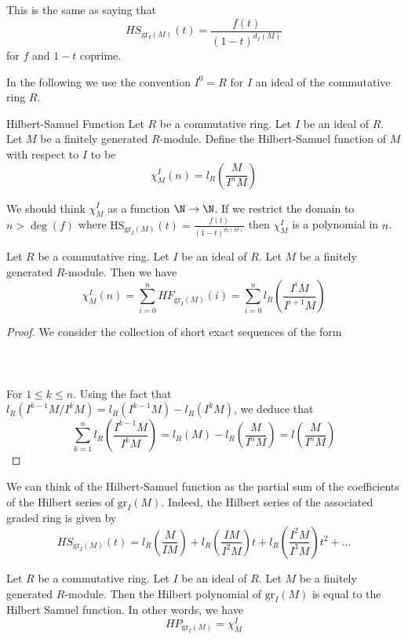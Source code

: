\documentclass[a4paper]{article}
\begin{document}
This is the same as saying that $$HS_{\text{gr}_I(M)}(t)=\frac{f(t)}{(1-t)^{d_I(M)}}$$ for $f$ and $1-t$ coprime. 

In the following we use the convention $I^0=R$ for $I$ an ideal of the commutative ring $R$. 

\begin{defn}{Hilbert-Samuel Function}{} Let $R$ be a commutative ring. Let $I$ be an ideal of $R$. Let $M$ be a finitely generated $R$-module. Define the Hilbert-Samuel function of $M$ with respect to $I$ to be $$\chi_M^I(n)=l_R\left(\frac{M}{I^nM}\right)$$
\end{defn}

We should think $\chi_M^I$ as a function $\N\to\N$. If we restrict the domain to $n>\deg(f)$ where $\text{HS}_{\text{gr}_I(M)}(t)=\frac{f(t)}{(1-t)^{d_I(M)}}$ then $\chi_M^I$ is a polynomial in $n$. 

\begin{prp}{}{} Let $R$ be a commutative ring. Let $I$ be an ideal of $R$. Let $M$ be a finitely generated $R$-module. Then we have $$\chi_M^I(n)=\sum_{i=0}^nHF_{\text{gr}_I(M)}(i)=\sum_{i=0}^nl_R\left(\frac{I^iM}{I^{i+1}M}\right)$$ \tcbline
\begin{proof}
We consider the collection of short exact sequences of the form \\~\\
 \\~\\
For $1\leq k\leq n$. Using the fact that $l_R(I^{k-1}M/I^kM)=l_R(I^{k-1}M)-l_R(I^kM)$, we deduce that $$\sum_{k=1}^nl_R\left(\frac{I^{k-1}M}{I^kM}\right)=l_R(M)-l_R\left(\frac{M}{I^nM}\right)=l\left(\frac{M}{I^nM}\right)$$
\end{proof}
\end{prp}

We can think of the Hilbert-Samuel function as the partial sum of the coefficients of the Hilbert series of $\text{gr}_I(M)$. Indeed, the Hilbert series of the associated graded ring is given by $$HS_{\text{gr}_I(M)}(t)=l_R\left(\frac{M}{IM}\right)+l_R\left(\frac{IM}{I^2M}\right)t+l_R\left(\frac{I^2M}{I^3M}\right)t^2+\dots$$

\begin{prp}{}{} Let $R$ be a commutative ring. Let $I$ be an ideal of $R$. Let $M$ be a finitely generated $R$-module. Then the Hilbert polynomial of $\text{gr}_I(M)$ is equal to the Hilbert Samuel function. In other words, we have $$HP_{\text{gr}_I(M)}=\chi_M^I$$
\end{prp}
\end{document}
